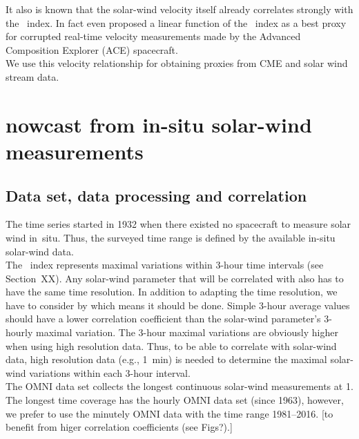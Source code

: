 It also is known that the solar-wind velocity itself already correlates strongly with the \Kp~index. In fact \citet{Machol2013} even proposed a linear function of the \Kp~index as a best proxy for corrupted real-time velocity measurements made by the Advanced Composition Explorer (ACE) spacecraft.\\

We use this velocity relationship for obtaining \Kp{} proxies from CME and solar wind stream data.\\


\section{\Kp{} nowcast from in-situ solar-wind measurements}
\label{sec:kp_nowcast}

\subsection{Data set, data processing and correlation}
\label{sec:data_set__data_processing_and_correlation}
The \Kp{} time series started in 1932 when there existed no spacecraft to measure solar wind in~situ. Thus, the surveyed time range is defined by the available in-situ solar-wind data.\\

The \Kp{}~index represents maximal variations within 3-hour time intervals (see Section~XX). Any solar-wind parameter that will be correlated with \Kp{} also has to have the same time resolution. In addition to adapting the time resolution, we have to consider by which means it should be done. Simple 3-hour average values should have a lower correlation coefficient than the solar-wind parameter's 3-hourly maximal variation.
The 3-hour maximal variations are obviously higher when using high resolution data. Thus, to be able to correlate \Kp{} with solar-wind data, high resolution data (e.g., 1~min) is needed to determine the maximal solar-wind variations within each 3-hour interval.\\

The OMNI data set collects the longest continuous solar-wind measurements at \SI{1}{\au}. The longest time coverage has the hourly OMNI data set (since 1963), however, we prefer to use the minutely OMNI data with the time range 1981--2016. [to benefit from higer correlation coefficients (see Figs?).]\\

